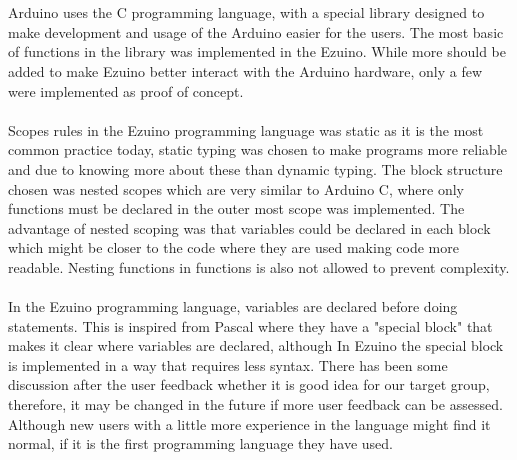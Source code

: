 \\\\
Arduino uses the C programming language, with a special library designed to make development and usage of the Arduino easier for the users. 
The most basic of functions in the library was implemented in the Ezuino. While more should be added to make Ezuino better interact with the Arduino hardware, only a few were implemented as proof of concept.
\\\\
Scopes rules in the Ezuino programming language was static as it is the most common practice today, static typing was chosen to make programs more reliable and due to knowing more about these than dynamic typing. The block structure chosen was nested scopes which are very similar to Arduino C, where only functions must be declared in the outer most scope was implemented. The advantage of nested scoping was that variables could be declared in each block which might be closer to the code where they are used making code more readable. Nesting functions in functions is also not allowed to prevent complexity.
\\\\
In the Ezuino programming language, variables are declared before doing statements. This is inspired from Pascal where they have a "special block" that makes it clear where variables are declared, although In Ezuino the special block is implemented in a way that requires less syntax. There has been some discussion after the user feedback whether it is good idea for our target group, therefore, it may be changed in the future if more user feedback can be assessed. Although new users with a little more experience in the language might find it normal, if it is the first programming language they have used.
 



